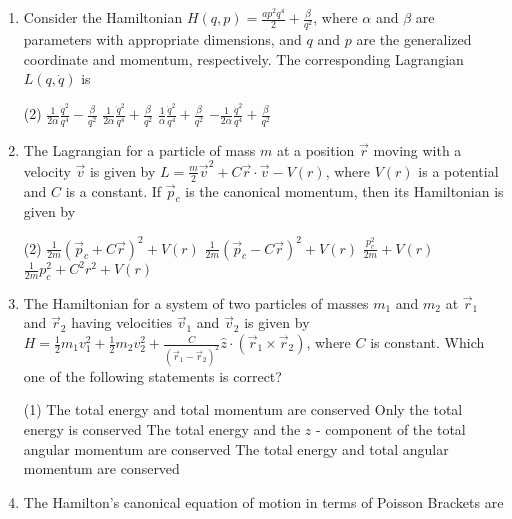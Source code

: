 \begin{enumerate}
	{}
	\item  Consider the Hamiltonian $H(q, p)=\frac{a p^{2} q^{4}}{2}+\frac{\beta}{q^{2}}$, where $\alpha$ and $\beta$ are parameters with appropriate dimensions, and $q$ and $p$ are the generalized coordinate and momentum, respectively. The corresponding Lagrangian $L(q, \dot{q})$ is
{}
	 \begin{tasks}(2)
		\task[\textbf{a.}] $\frac{1}{2 \alpha} \frac{\dot{q}^{2}}{q^{4}}-\frac{\beta}{q^{2}}$
		\task[\textbf{b.}]$\frac{1}{2 \alpha} \frac{\dot{q}^{2}}{q^{4}}+\frac{\beta}{q^{2}}$
		\task[\textbf{c.}]$\frac{1}{\alpha} \frac{\dot{q}^{2}}{q^{4}}+\frac{\beta}{q^{2}}$
		\task[\textbf{d.}] $-\frac{1}{2 \alpha} \frac{\dot{q}^{2}}{q^{4}}+\frac{\beta}{q^{2}}$
	\end{tasks}
	\item  The Lagrangian for a particle of mass $m$ at a position $\vec{r}$ moving with a velocity $\vec{v}$ is given by $L=\frac{m}{2} \vec{v}^{2}+C \vec{r} \cdot \vec{v}-V(r)$, where $V(r)$ is a potential and $C$ is a constant. If $\vec{p}_{c}$ is the canonical momentum, then its Hamiltonian is given by
{}
	 \begin{tasks}(2)
		\task[\textbf{a.}]$\frac{1}{2 m}\left(\vec{p}_{c}+C \vec{r}\right)^{2}+V(r)$
		\task[\textbf{b.}]$\frac{1}{2 m}\left(\vec{p}_{c}-C \vec{r}\right)^{2}+V(r)$
		\task[\textbf{c.}]$\frac{p_{c}^{2}}{2 m}+V(r)$
		\task[\textbf{d.}]  $\frac{1}{2 m} p_{c}^{2}+C^{2} r^{2}+V(r)$
	\end{tasks}
	\item  The Hamiltonian for a system of two particles of masses $m_{1}$ and $m_{2}$ at $\vec{r}_{1}$ and $\vec{r}_{2}$ having velocities $\vec{v}_{1}$ and $\vec{v}_{2}$ is given by $H=\frac{1}{2} m_{1} v_{1}^{2}+\frac{1}{2} m_{2} v_{2}^{2}+\frac{C}{\left(\vec{r}_{1}-\vec{r}_{2}\right)^{2}} \hat{z} \cdot\left(\vec{r}_{1} \times \vec{r}_{2}\right)$, where $C$ is constant. Which one of the following statements is correct?
	{}
	 \begin{tasks}(1)
		\task[\textbf{a.}] The total energy and total momentum are conserved
		\task[\textbf{b.}]Only the total energy is conserved
		\task[\textbf{c.}]The total energy and the $z$ - component of the total angular momentum are conserved
		\task[\textbf{d.}]  The total energy and total angular momentum are conserved
	\end{tasks}
	\item  The Hamilton's canonical equation of motion in terms of Poisson Brackets are

\end{enumerate}
